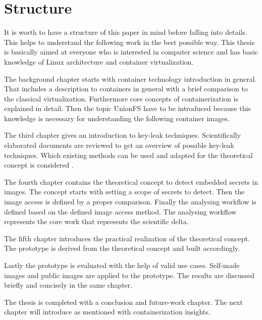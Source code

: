 %
%
\section{Structure}
\label{sec:intro:structure}
It is worth to have a structure of this paper in mind before falling into details. This helps to understand the following work in the best possible way. This thesis is basically aimed at everyone who is interested in computer science and has basic knowledge of Linux architecture and container virtualization.

The background chapter starts with container technology introduction in general. 
That includes a description to containers in general with a brief comparison to the classical virtualization. Furthermore core concepts of containerization is explained in detail.
Then the topic UnionFS have to be introduced because this knowledge is necessary for understanding the following container images.

The third chapter gives an introduction to key-leak techniques.
Scientifically elaborated documents are reviewed to get an overview of possible key-leak techniques.
Which existing methods can be used and adapted for the theoretical concept is considered .

The fourth chapter contains the theoretical concept to detect embedded secrets in images. The concept starts with setting a scope of secrets to detect. Then the image access is defined by a proper comparison.
Finally the analysing workflow is defined based on the defined image access method.
The analysing workflow represents the core work that represents the scientific delta.

The fifth chapter introduces the practical realization of the theoretical concept. The prototype is derived from the theoretical concept and built accordingly.

Lastly the prototype is evaluated with the help of valid use cases. Self-made images and public images are applied to the prototype. The results are discussed briefly and concisely in the same chapter.

The thesis is completed with a conclusion and future-work chapter.	
The next chapter will introduce as mentioned with containerization insights.
